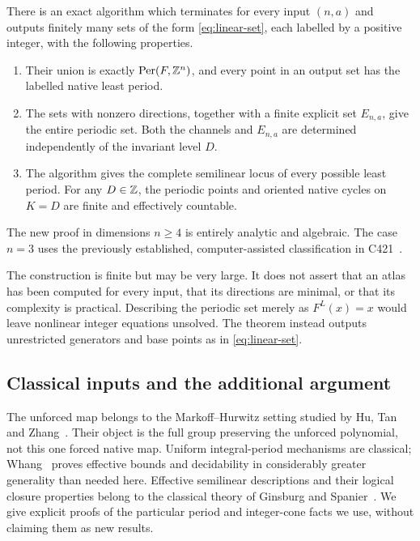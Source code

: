 \begin{theorem}
\label{thm:main}
There is an exact algorithm which terminates for every input $(n,a)$
and outputs finitely many sets of the form \eqref{eq:linear-set}, each
labelled by a positive integer, with the following properties.
\begin{enumerate}
\item Their union is exactly $\operatorname{Per}(F,\mathbb Z^n)$, and every point in an
output set has the labelled native least period.
\item The sets with nonzero directions, together with a finite explicit
set $E_{n,a}$, give the entire periodic set. Both the channels and
$E_{n,a}$ are determined independently of the invariant level $D$.
\item The algorithm gives the complete semilinear locus of every
possible least period. For any $D\in\mathbb Z$, the periodic points and
oriented native cycles on $K=D$ are finite and effectively countable.
\end{enumerate}
The new proof in dimensions $n\ge4$ is entirely analytic and algebraic.
The case $n=3$ uses the previously established, computer-assisted
classification in C421~\cite{c421}.
\end{theorem}

The construction is finite but may be very large. It does not assert
that an atlas has been computed for every input, that its directions
are minimal, or that its complexity is practical. Describing the
periodic set merely as $F^L(x)=x$ would leave nonlinear integer equations
unsolved. The theorem instead outputs unrestricted generators and base
points as in \eqref{eq:linear-set}.

\subsection{Classical inputs and the additional argument}

The unforced map belongs to the Markoff--Hurwitz setting studied by
Hu, Tan and Zhang~\cite{huTanZhang2015}. Their object is the full group
preserving the unforced polynomial, not this one forced native map.
Uniform integral-period mechanisms are classical; Whang~\cite{whang2023}
proves effective bounds and decidability in considerably greater
generality than needed here. Effective semilinear descriptions and
their logical closure properties belong to the classical theory of
Ginsburg and Spanier~\cite{ginsburgSpanier1966}. We give explicit
proofs of the particular period and integer-cone facts we use, without
claiming them as new results.

